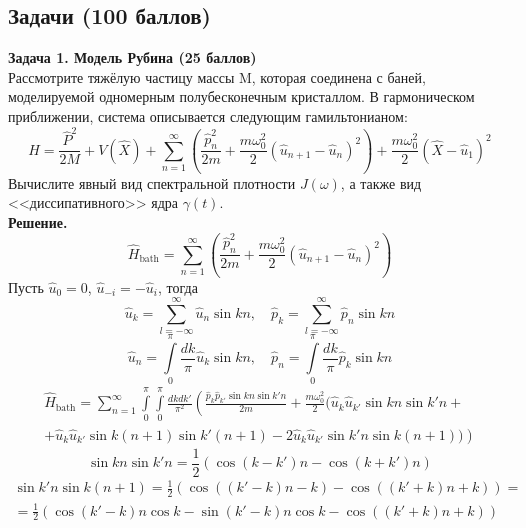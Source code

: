\documentclass[12pt]{article}
\theoremstyle{definition}
\begin{document}
\subsection*{Задачи (100 баллов)}
\textbf{Задача 1. Модель Рубина (25 баллов)}\\
Рассмотрите тяжёлую частицу массы M, которая соединена с баней, моделируемой одномерным полубесконечным кристаллом. В гармоническом приближении, система описывается следующим гамильтонианом:
\begin{equation}
    \hat{H}=\frac{\hat{P}^2}{2M}+V(\hat{X})+\sum\limits_{n=1}^\infty\left(\frac{\hat{p}_n^2}{2m}+\frac{m\omega^2_0}{2}(\hat{u}_{n+1}-\hat{u}_n)^2\right)+\frac{m\omega^2_0}{2}(\hat{X}-\hat{u}_1)^2
\end{equation}
Вычислите явный вид спектральной плотности $J(\omega)$, а также вид <<диссипативного>> ядра $\gamma(t)$.\\
\textbf{Решение.}
\begin{equation}
    \hat{H}_\text{bath}=\sum\limits_{n=1}^\infty\left(\frac{\hat{p}_n^2}{2m}+\frac{m\omega^2_0}{2}(\hat{u}_{n+1}-\hat{u}_n)^2\right)
\end{equation}
Пусть $\hat{u}_0=0$, $\hat{u}_{-i}=-\hat{u}_i$, тогда
\begin{equation}
    \hat{u}_k=\sum\limits_{l=-\infty}^\infty\hat{u}_n\sin kn,\quad\hat{p}_k=\sum\limits_{l=-\infty}^\infty\hat{p}_n\sin kn
\end{equation}
\begin{equation}
    \hat{u}_n=\int\limits_0^\pi\frac{dk}{\pi}\hat{u}_k\sin kn,\quad\hat{p}_n=\int\limits_0^\pi\frac{dk}{\pi}\hat{p}_k\sin kn
\end{equation}
\begin{multline}
    \hat{H}_\text{bath}=\sum\limits_{n=1}^\infty\int\limits_0^\pi\int\limits_0^\pi\frac{dkdk'}{\pi^2}\left(\frac{\hat{p}_k\hat{p}_{k'}\sin kn\sin k'n}{2m}+\frac{m\omega^2_0}{2}(\hat{u}_k\hat{u}_{k'}\sin kn\sin k'n+\right.\\\left.+\hat{u}_k\hat{u}_{k'}\sin k(n+1)\sin k'(n+1)-2\hat{u}_k\hat{u}_{k'}\sin k'n\sin k(n+1))\right)
\end{multline}
\begin{equation}
    \sin kn\sin k'n=\frac{1}{2}(\cos(k-k')n-\cos(k+k')n)
\end{equation}
\begin{multline}
    \sin k'n\sin k(n+1)=\frac{1}{2}(\cos((k'-k)n-k)-\cos((k'+k)n+k))=\\=\frac{1}{2}(\cos(k'-k)n\cos k-\sin(k'-k)n\cos k-\cos((k'+k)n+k))
\end{multline}
\end{document}
